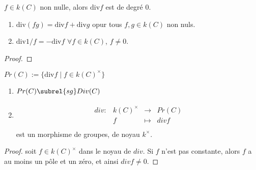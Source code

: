         \begin{theo}
            $f \in k(C)$ non nulle, alors $\mathrm{div} f$ est de degré $0$.
        \end{theo}
        \begin{prop}
            \begin{enumerate}
                \item $\mathrm{div} (fg) = \mathrm{div} f + \mathrm{div} g$ opur tous $f,g \in k(C)$ non nuls.
                \item $\mathrm{div} 1/f = - \mathrm{div} f$ $\forall f \in k(C)$, $f \neq 0$.
            \end{enumerate}
        \end{prop}
        \begin{proof}
        \end{proof}
        \begin{defi}
            $Pr(C) := \{\mathrm{div} f \mid f \in k(C)^\times\}$
        \end{defi}
        \begin{prop}
            \begin{enumerate}
                \item $Pr(C) \subrel{sg} Div(C)$
                \item \begin{align*}
                    \begin{array}{cccc}
                        div : & k(C)^\times & \to & Pr(C) \\
                        & f & \mapsto & div f \\
                    \end{array}
                \end{align*}
                est un morphisme de groupes, de noyau $k^\times$.
            \end{enumerate}
        \end{prop}
        \begin{proof}
            soit $f \in k(C)^\times$ dans le noyau de $div$. Si $f$ n'est pas constante, alors $f$ a au moins un pôle et un zéro, et ainsi $div f \neq 0$.
        \end{proof}
        
